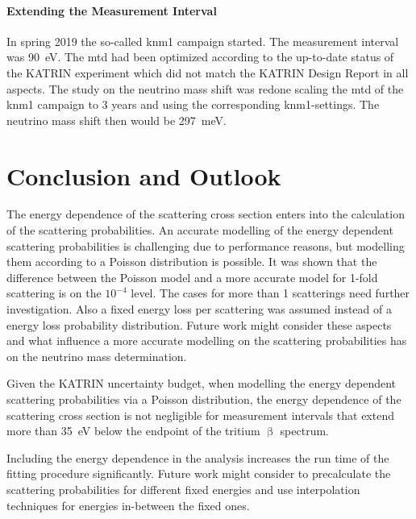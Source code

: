 \paragraph{Extending the Measurement Interval}
In spring 2019 the so-called \gls{knm1} campaign started. The measurement interval was \SI{90}{eV}. The \gls{mtd} had been optimized according to the up-to-date status of the KATRIN experiment which did not match the KATRIN Design Report in all aspects. The study on the neutrino mass shift was redone scaling the \gls{mtd} of the \gls{knm1} campaign to 3 years and using the corresponding \gls{knm1}-settings. The neutrino mass shift then would be \SI{297}{meV}.


\section{Conclusion and Outlook}
The energy dependence of the scattering cross section enters into the calculation of the scattering probabilities. An accurate modelling of the energy dependent scattering probabilities is challenging due to performance reasons, but modelling them according to a Poisson distribution is possible. It was shown that the difference between the Poisson model and a more accurate model for 1-fold scattering is on the $10^{-4}$ level. The cases for more than 1 scatterings need further investigation. Also a fixed energy loss per scattering was assumed instead of a energy loss probability distribution. Future work might consider these aspects and what influence a more accurate modelling on the scattering probabilities has on the neutrino mass determination.

Given the KATRIN uncertainty budget, when modelling the energy dependent scattering probabilities via a Poisson distribution, the energy dependence of the scattering cross section is not negligible for measurement intervals that extend more than \SI{35}{eV} below the endpoint of the tritium $\upbeta$ spectrum.

Including the energy dependence in the analysis increases the run time of the fitting procedure significantly. Future work might consider to precalculate the scattering probabilities for different fixed energies and use interpolation techniques for energies in-between the fixed ones.